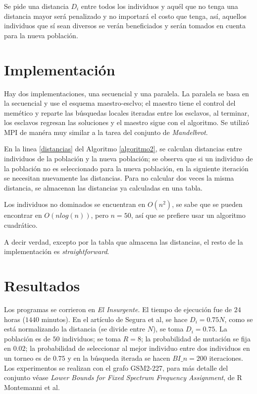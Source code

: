 \documentclass[10pt,a4paper]{article}
\begin{document}
\noindent Se pide una distancia $D_i$ entre todos los individuos y aquél que no tenga una distancia mayor será penalizado y no importará el costo que tenga, así, aquellos individuos que sí sean diversos se verán beneficiados y serán tomados en cuenta para la nueva población.

\section{Implementación}

\noindent Hay dos implementaciones, una secuencial y una paralela. La paralela se basa en la secuencial y use el esquema maestro-esclvo; el maestro tiene el control del memético y reparte las búsquedas locales iteradas entre los esclavos, al terminar, los esclavos regresan las soluciones y el maestro sigue con el algoritmo. Se utilizó MPI de manéra muy similar a la tarea del conjunto de \textit{Mandelbrot}.

\noindent  En la linea \ref{distancias} del Algoritmo \ref{algoritmo2}, se calculan distancias entre individuos de la población y la nueva población; se observa que si un individuo de la población no es seleccionado para la nueva población, en la siguiente iteración se necesitan nuevamente las distancias. Para no calcular dos veces la misma distancia, se almacenan las distancias ya calculadas en una tabla. 

\noindent Los individuos no dominados se encuentran en $O\left(n^2\right)$, se sabe que se pueden encontrar en $O(n log(n))$, pero $n = 50$, así que se prefiere usar un algoritmo cuadrático. 

\noindent A decir verdad, excepto por la tabla que almacena las distancias, el resto de la implementación es \textit{straightforward}.


\section{Resultados}

\noindent Los programas se corrieron en \textit{El Insurgente}. El tiempo de ejecución fue de $24$ horas ($1440$ minutos). En el artículo de Segura et al, se hace $D_i = 0{.}75 N$, como se está normalizando la distancia (se divide entre $N$), se toma $D_i = 0{.}75$. La población es de $50$ individuos; se toma $R = 8$; la probabilidad de mutación se fija en $0{.}02$; la probabilidad de seleccionar al mejor individuo entre dos individuos en un torneo es de $0{.}75$ y en la búsqueda iterada se hacen $BI\_n = 200$ iteraciones. Los experimentos se realizan con el grafo GSM2-227, para más detalle del conjunto véase \textit{Lower Bounds for Fixed Spectrum Frequency Assignment}, de R Montemanni et al.
\end{document}

